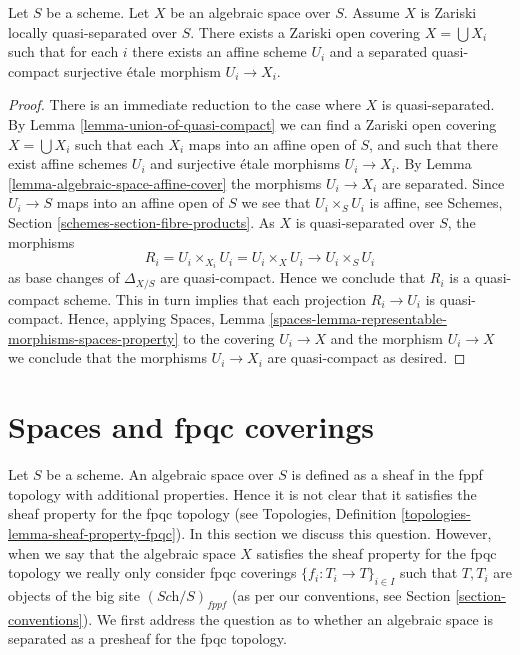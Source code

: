 \begin{lemma}
\label{lemma-quasi-separated-quasi-compact-pieces}
Let $S$ be a scheme.
Let $X$ be an algebraic space over $S$.
Assume $X$ is Zariski locally quasi-separated over $S$.
There exists a Zariski open covering $X = \bigcup X_i$ such
that for each $i$ there exists an affine scheme
$U_i$ and a separated quasi-compact surjective \'etale
morphism $U_i \to X_i$.
\end{lemma}

\begin{proof}
There is an immediate reduction to the case where $X$ is quasi-separated. By
Lemma \ref{lemma-union-of-quasi-compact}
we can find a Zariski open covering $X = \bigcup X_i$ such that each
$X_i$ maps into an affine open of $S$, and such that there exist affine
schemes $U_i$ and surjective \'etale morphisms $U_i \to X_i$. By
Lemma \ref{lemma-algebraic-space-affine-cover}
the morphisms $U_i \to X_i$ are separated. Since $U_i \to S$ maps into
an affine open of $S$ we see that $U_i \times_S U_i$ is affine, see
Schemes, Section \ref{schemes-section-fibre-products}.
As $X$ is quasi-separated over $S$, the morphisms
$$
R_i = U_i \times_{X_i} U_i = U_i \times_X U_i
\longrightarrow
U_i \times_S U_i
$$
as base changes of $\Delta_{X/S}$ are quasi-compact. Hence we conclude
that $R_i$ is a quasi-compact scheme. This in turn implies that each
projection $R_i \to U_i$ is quasi-compact. Hence, applying
Spaces, Lemma \ref{spaces-lemma-representable-morphisms-spaces-property}
to the covering $U_i \to X$ and the morphism $U_i \to X$
we conclude that the morphisms $U_i \to X_i$ are quasi-compact as desired.
\end{proof}









\section{Spaces and fpqc coverings}
\label{section-fpqc}

\noindent
Let $S$ be a scheme.
An algebraic space over $S$ is defined as a sheaf in the fppf topology with
additional properties. Hence it is not clear that it satisfies the sheaf
property for the fpqc topology (see
Topologies, Definition \ref{topologies-lemma-sheaf-property-fpqc}).
In this section we discuss this question. However, when we say that
the algebraic space $X$ satisfies the sheaf property for the fpqc topology
we really only consider fpqc coverings $\{f_i : T_i \to T\}_{i \in I}$ such
that $T, T_i$ are objects of the big site $(\textit{Sch}/S)_{fppf}$ (as per
our conventions, see Section \ref{section-conventions}). We first address the
question as to whether an algebraic space is separated as a presheaf for the
fpqc topology.

